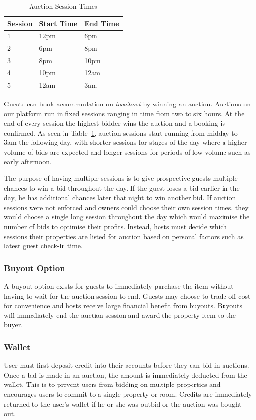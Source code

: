 \begin{table}[!h]
\centering
  \begin{tabular}{|l|l|l|}
  \hline
  Session & Start Time & End Time \\ \hline
  1       & 12pm       & 6pm      \\
  2       & 6pm        & 8pm      \\
  3       & 8pm        & 10pm     \\
  4       & 10pm       & 12am     \\
  5       & 12am       & 3am      \\ \hline
  \end{tabular}
  \caption{Auction Session Times}
  \label{tab:sessionTimes}
\end{table}

Guests can book accommodation on \emph{localhost} by winning an auction.
Auctions on our platform run in fixed sessions ranging in time from two to six hours.
At the end of every session the highest bidder wins the auction and a booking is confirmed.
As seen in Table~\ref{tab:sessionTimes},
auction sessions start running from midday to 3am the following day, with shorter sessions
for stages of the day where a higher volume of bids are expected and longer sessions
for periods of low volume such as early afternoon.

The purpose of having multiple sessions is to give prospective guests multiple chances to
win a bid throughout the day. If the guest loses a bid earlier in the day, he has
additional chances later that night to win another bid. If auction
sessions were not enforced and owners could choose their own session times, they
would choose a single long session throughout the day which would
maximise the number of bids to optimise their profits.
Instead, hosts must decide which sessions their properties are listed for auction
based on personal factors such as latest guest check-in time.

\subsubsection{Buyout Option}
A buyout option exists for guests to immediately purchase
the item without having to wait for the auction session to end. Guests may choose to
trade off cost for convenience and hosts receive large financial benefit from buyouts.
Buyouts will immediately end the auction session and award the property item to the buyer.

\subsubsection{Wallet}
User must first deposit credit into their accounts before they can bid in auctions.
Once a bid is made in
an auction, the amount is immediately deducted from the wallet. This is to prevent
users from bidding on multiple properties and encourages users to commit to a single
property or room. Credits are immediately returned to the user's wallet if
he or she was outbid or the auction was bought out.
